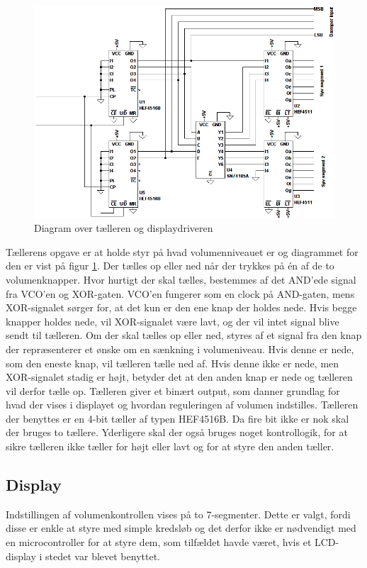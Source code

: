 \begin{figure}[h]
\centering
\includegraphics[width=\textwidth]{teknisk/volumenkontrol/taeller.png}
\caption{Diagram over tælleren og displaydriveren}
\label{fig:taeller}
\end{figure}
Tællerens opgave er at holde styr på hvad volumenniveauet er og diagrammet for den er vist på figur \ref{fig:taeller}. Der tælles op eller ned når der trykkes på én af de to volumenknapper. Hvor hurtigt der skal tælles, bestemmes af det AND'ede signal fra VCO'en og XOR-gaten. VCO'en fungerer som en clock på AND-gaten, mens XOR-signalet sørger for, at det kun er den ene knap der holdes nede. Hvis begge knapper holdes nede, vil XOR-signalet være lavt, og der vil intet signal blive sendt til tælleren. Om der skal tælles op eller ned, styres af et signal fra den knap der repræsenterer et ønske om en sænkning i volumeniveau. Hvis denne er nede, som den eneste knap, vil tælleren tælle ned af. Hvis denne ikke er nede, men XOR-signalet stadig er højt, betyder det at den anden knap er nede og tælleren vil derfor tælle op. Tælleren giver et binært output, som danner grundlag for hvad der vises i displayet og hvordan reguleringen af volumen indstilles. Tælleren der benyttes er en 4-bit tæller af typen HEF4516B. Da fire bit ikke er nok skal der bruges to tællere. Yderligere skal der også bruges noget kontrollogik, for at sikre tælleren ikke tæller for højt eller lavt og for at styre den anden tæller.

\subsection*{Display}
\label{volumenkontrol-design-display}
Indstillingen af volumenkontrollen vises på to 7-segmenter. Dette er valgt, fordi disse er enkle at styre med simple kredsløb og det derfor ikke er nødvendigt med en microcontroller for at styre dem, som tilfældet havde været, hvis et LCD-display i stedet var blevet benyttet.

